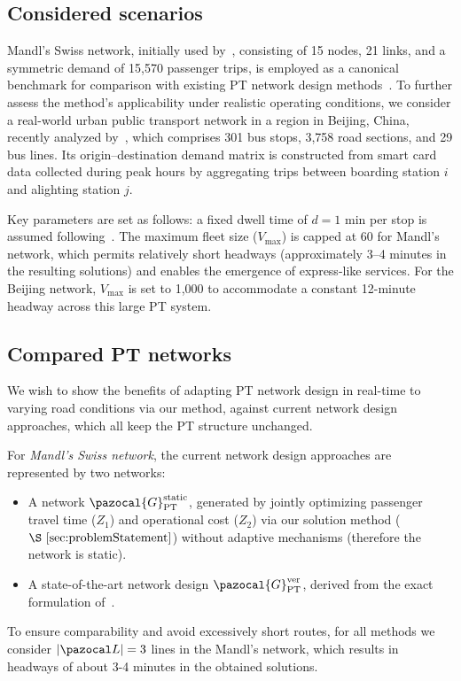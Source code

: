\documentclass[a4paper,fleqn]{cas-sc}
\begin{document}
\subsection{Considered scenarios}
Mandl’s Swiss network, initially used by~\citet{mandl1980evaluation}, consisting of 15 nodes, 21 links, and a symmetric demand of 15{,}570 passenger trips, is employed as a canonical benchmark for comparison with existing PT network design methods~\citep{liang2025novel, ahern2022approximate}. To further assess the method’s applicability under realistic operating conditions, we consider a real-world urban public transport network in a region in Beijing, China, recently analyzed by~\citet{wu2024multi}, which comprises 301 bus stops, 3,758 road sections, and 29 bus lines. Its origin--destination demand matrix is constructed from smart card data collected during peak hours by aggregating trips between boarding station $i$ and alighting station $j$. 

Key parameters are set as follows: a fixed dwell time of $d=1$ min per stop is assumed following~\citet{chen2022TRSC}. 
The maximum fleet size ($V_{\max}$) is capped at 60 for Mandl’s network, which permits relatively short headways (approximately 3–4 minutes in the resulting solutions) and enables the emergence of express-like services. 
For the Beijing network, $V_{\max}$ is set to 1,000 to accommodate a constant 12-minute headway across this large PT system. 

\subsection{Compared PT networks}
\label{sec:compared-PT-networks}

We wish to show the benefits of adapting PT network design in real-time to varying road conditions via our method, against current network design approaches, which all keep the PT structure unchanged.

For \emph{Mandl’s Swiss network}, the current network design approaches are represented by two networks:
\begin{itemize}
\item A network $\pazocal{G}_{\text{PT}}^{\text{static}}$, generated by jointly optimizing passenger travel time ($Z_1$) and operational cost ($Z_2$) via our solution method ($\S~\ref{sec:problemStatement}$) without adaptive mechanisms (therefore the network is static).
\item A state-of-the-art network design $\pazocal{G}_{\text{PT}}^{\text{ver}}$, derived from the exact formulation of~\citet{vermeir2021exact}.
\end{itemize}
To ensure comparability and avoid excessively short routes, for all methods we consider $|\pazocal L|=3$ lines in the Mandl's network, which results in headways of about 3-4 minutes in the obtained solutions.
\end{document}
